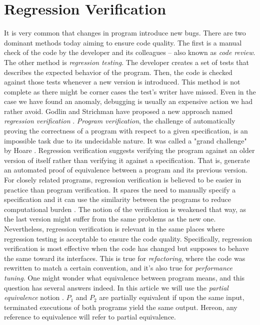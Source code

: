 
\section{Regression Verification}
It is very common that changes in program introduce new bugs. There are two dominant methods today aiming to ensure code quality. The first is a manual check of the code by the developer and its colleagues – also known as \emph{code review}. The other method is \emph{regression testing}. The developer creates a set of tests that describes the expected behavior of the program. Then, the code is checked against those tests whenever a new version is introduced. This method is not complete as there might be corner cases the test's writer have missed. Even in the case we have found an anomaly, debugging is usually an expensive action we had rather avoid. Godlin and Strichman have proposed a new approach named \emph{regression verification} \cite{DBLP:conf/dac/GodlinS09}. \emph{Program verification}, the challenge of automatically proving the correctness of a program with respect to a given specification, is an impossible task due to its undecidable nature. It was called a "grand challenge" by Hoare \cite{DBLP:journals/jacm/Hoare03}. Regression verification suggests verifying the program against an older version of itself rather than verifying it against a specification. That is, generate an automated proof of equivalence between a program and its previous version. For closely related programs, regression verification is believed to be easier in practice than program verification. It spares the need to manually specify a specification and it can use the similarity between the programs to reduce computational burden \cite{DBLP:conf/dac/GodlinS09}. The notion of the verification is weakened that way, as the last version might suffer from the same problems as the new one. Nevertheless, regression verification is relevant in the same places where regression testing is acceptable to ensure the code quality. Specifically, regression verification is most effective when the code has changed but supposes to behave the same toward its interfaces. This is true for \emph{refactoring}, where the code was rewritten to match a certain convention, and it's also true for \emph{performance tuning}. One might wonder what equivalence between program means, and this question has several answers indeed. In this article we will use the \emph{partial equivalence} notion \cite{DBLP:conf/dac/GodlinS09}. $P_1$ and $P_2$ are partially equivalent if upon the same input, terminated executions of both programs yield the same output. Hereon, any reference to equivalence will refer to partial equivalence.

